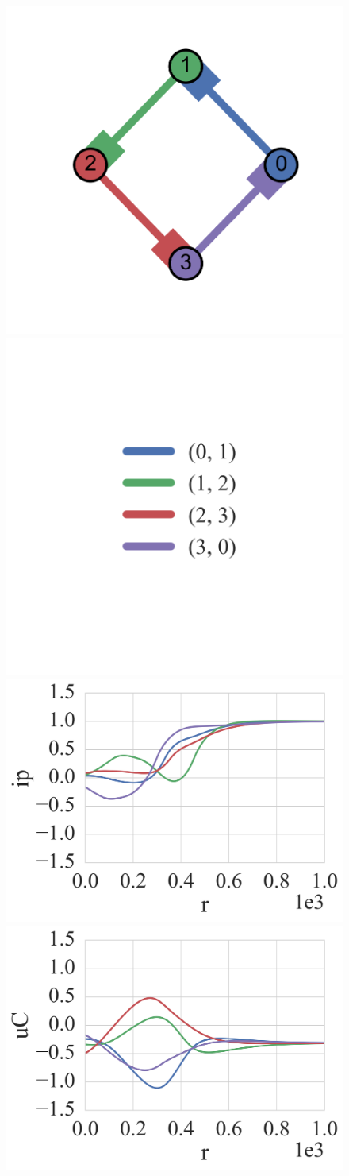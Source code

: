 \documentclass{standalone}
\begin{document}
  \begin{minipage}[t]{\textwidth}

  \begin{figure}
      \centering
      \includegraphics[width=0.4\linewidth,keepaspectratio,trim={0 3cm 0 2cm},clip]{./pics/cycle/cycle_4.png}
      \qquad
      \includegraphics[width=0.4\linewidth,keepaspectratio,trim={0 3cm 0 2cm},clip]{./pics/cycle/cycle_4_legend.png}
      \vfill
      \includegraphics[width=0.4\linewidth,keepaspectratio]{./pics/cycle/cycle_4_ip_positive.png}
      \qquad
      \includegraphics[width=0.4\linewidth,keepaspectratio]{./pics/cycle/cycle_4_uC_positive.png}
  \end{figure}

  \end{minipage}
\end{document}
